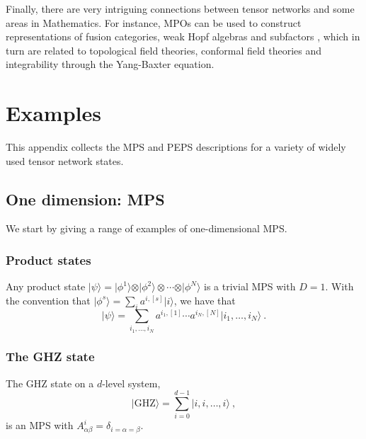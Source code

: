 \documentclass[rmp,aps,reprint,superscriptaddress,nobalancelastpage]{revtex4-1}
\newcommand{\ket}[1]{\vert#1\rangle}
\def\TOCstop{\addtocontents{toc}{\ignorethis}}
\begin{document}
    Finally, there are very intriguing connections between tensor networks and some areas in Mathematics. For instance, MPOs can be used to construct representations of fusion categories, weak Hopf algebras and subfactors \cite{lootens2020matrix,kawahigashi2020remark,molnar:WHA}, which in turn are related to topological field theories, conformal field theories and integrability through the Yang-Baxter equation.
    \appendix


    \section{Examples%
      \label{app:examples}}

    This appendix collects the MPS and PEPS descriptions for a variety of widely used tensor network states.

    \subsection{One dimension: MPS}
    \TOCstop


    We start by giving a range of examples of one-dimensional MPS.

    \subsubsection{Product states} Any product state $\ket{\psi}=\ket{\phi^1}\otimes\ket{\phi^2}\otimes\cdots\otimes\ket{\phi^N}$ is a trivial MPS with $D=1$. With the convention that $\ket{\phi^s}=\sum_i a^{i,[s]}\ket{i}$, we have that
    \begin{equation}
        \ket\psi = \sum_{i_1,\dots,i_N} a^{i_1,[1]}\cdots a^{i_N,[N]}\ket{i_1,\dots,i_N}\ .
    \end{equation}


    \subsubsection{The GHZ state}


    The GHZ state on  a $d$-level system,
    \[
        \ket{\mathrm{GHZ}}=\sum_{i=0}^{d-1}\ket{i,i,\dots,i}\ ,
    \]
    is an MPS with $A^{i}_{\alpha\beta}=\delta_{i=\alpha=\beta}$.
\end{document}
